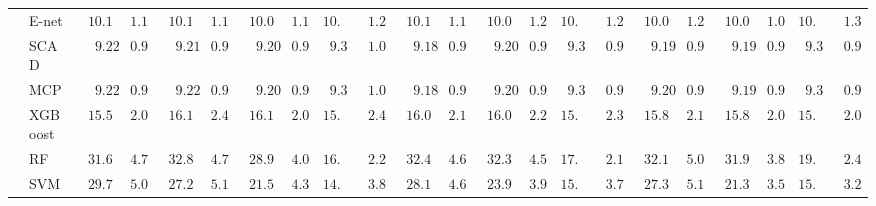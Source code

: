 \begin{tabular}{ll|ll|llllll|llllll|llllll}
 & E-net  & $\phantom{0}10.10$ & $\phantom{0}1.18$ & $\phantom{0}10.19$ & $\phantom{0}1.14$ & $\phantom{0}10.08$ & $\phantom{0}1.14$ & $10.06$ & $\phantom{0}1.20$ & $\phantom{0}10.10$ & $\phantom{0}1.15$ & $\phantom{0}10.08$ & $\phantom{0}1.25$ & $10.08$ & $\phantom{0}1.22$ & $\phantom{0}10.02$ & $\phantom{0}1.23$ & $\phantom{0}10.00$ & $\phantom{0}1.09$ & $10.01$ & $\phantom{0}1.32$ \\
 & SCAD  & $\phantom{00}9.22$ & $\phantom{0}0.94$ & $\phantom{00}9.21$ & $\phantom{0}0.97$ & $\phantom{00}9.20$ & $\phantom{0}0.95$ & $\phantom{0}9.33$ & $\phantom{0}1.00$ & $\phantom{00}9.18$ & $\phantom{0}0.93$ & $\phantom{00}9.20$ & $\phantom{0}0.93$ & $\phantom{0}9.35$ & $\phantom{0}0.94$ & $\phantom{00}9.19$ & $\phantom{0}0.92$ & $\phantom{00}9.19$ & $\phantom{0}0.94$ & $\phantom{0}9.33$ & $\phantom{0}0.98$ \\
 & MCP  & $\phantom{00}9.22$ & $\phantom{0}0.95$ & $\phantom{00}9.22$ & $\phantom{0}0.98$ & $\phantom{00}9.20$ & $\phantom{0}0.95$ & $\phantom{0}9.33$ & $\phantom{0}1.00$ & $\phantom{00}9.18$ & $\phantom{0}0.93$ & $\phantom{00}9.20$ & $\phantom{0}0.93$ & $\phantom{0}9.37$ & $\phantom{0}0.94$ & $\phantom{00}9.20$ & $\phantom{0}0.93$ & $\phantom{00}9.19$ & $\phantom{0}0.94$ & $\phantom{0}9.34$ & $\phantom{0}0.98$ \\
 & XGBoost  & $\phantom{0}15.58$ & $\phantom{0}2.00$ & $\phantom{0}16.16$ & $\phantom{0}2.44$ & $\phantom{0}16.15$ & $\phantom{0}2.00$ & $15.29$ & $\phantom{0}2.42$ & $\phantom{0}16.02$ & $\phantom{0}2.12$ & $\phantom{0}16.04$ & $\phantom{0}2.25$ & $15.54$ & $\phantom{0}2.34$ & $\phantom{0}15.87$ & $\phantom{0}2.19$ & $\phantom{0}15.88$ & $\phantom{0}2.00$ & $15.44$ & $\phantom{0}2.07$ \\
 & RF  & $\phantom{0}31.64$ & $\phantom{0}4.75$ & $\phantom{0}32.85$ & $\phantom{0}4.75$ & $\phantom{0}28.97$ & $\phantom{0}4.01$ & $16.25$ & $\phantom{0}2.26$ & $\phantom{0}32.44$ & $\phantom{0}4.66$ & $\phantom{0}32.31$ & $\phantom{0}4.55$ & $17.87$ & $\phantom{0}2.13$ & $\phantom{0}32.17$ & $\phantom{0}5.06$ & $\phantom{0}31.90$ & $\phantom{0}3.85$ & $19.16$ & $\phantom{0}2.41$ \\
 & SVM  & $\phantom{0}29.78$ & $\phantom{0}5.08$ & $\phantom{0}27.23$ & $\phantom{0}5.11$ & $\phantom{0}21.54$ & $\phantom{0}4.34$ & $14.17$ & $\phantom{0}3.81$ & $\phantom{0}28.19$ & $\phantom{0}4.64$ & $\phantom{0}23.99$ & $\phantom{0}3.91$ & $15.92$ & $\phantom{0}3.71$ & $\phantom{0}27.32$ & $\phantom{0}5.18$ & $\phantom{0}21.34$ & $\phantom{0}3.50$ & $15.54$ & $\phantom{0}3.21$ \\\hline

\end{tabular}
